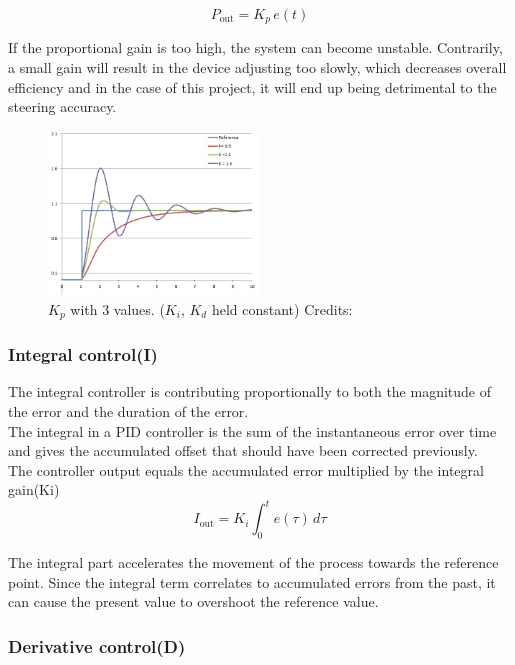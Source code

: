 $$ P_{\mathrm{out}}=K_p\,{e(t)}$$  

If the proportional gain is too high, the system can become unstable. Contrarily, a small gain will result in the device adjusting too slowly, which decreases overall efficiency and in the case of this project, it will end up being detrimental to the steering accuracy.

\begin{figure}[h!]
  \centering
  \includegraphics[width=0.5\textwidth]{figures/PIDP.jpg}
  
  \caption{$K_p$ with 3 values. ($K_i$, $K_d$ held constant) Credits: %
  }
  \label{PID controller}
\end{figure}


\subsubsection {Integral control(I)}



The integral controller is contributing proportionally to both the magnitude of the error and the duration of the error. \\
The integral in a PID controller is the sum of the instantaneous error over time and gives the accumulated offset that should have been corrected previously. \\ 

The controller output equals the accumulated error multiplied by the integral gain(Ki)\\
$$I_{\mathrm{out}}=K_{i}\int_{0}^{t}{e(\tau)}\,{d\tau}$$ 



The integral part accelerates the movement of the process towards the reference point.
Since the integral term correlates to accumulated errors from the past, it can cause the present value to overshoot the reference value.

\subsubsection {Derivative control(D)} 

